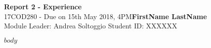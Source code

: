\documentclass[a4paper, 11pt]{article}
\begin{document}
\noindent
\large\textbf{Report 2 - Experience} \hfill  \\
\normalsize 17COD280 - Due on 15th May 2018, 4PM\hfill\textbf{FirstName LastName} \\
Module Leader: Andrea Soltoggio 
\hfill Student ID: XXXXXX

$body$
\end{document}
